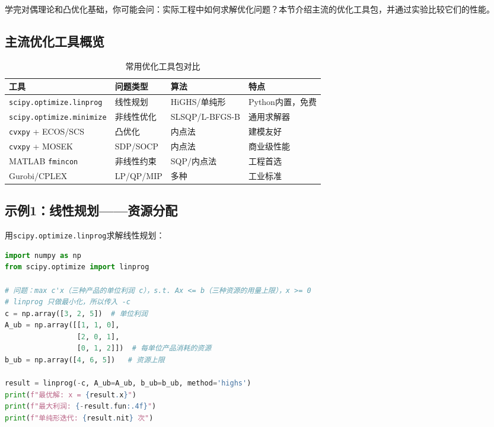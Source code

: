 学完对偶理论和凸优化基础，你可能会问：实际工程中如何求解优化问题？本节介绍主流的优化工具包，并通过实验比较它们的性能。

\subsection*{主流优化工具概览}

\begin{table}[htbp]
\centering
\small
\renewcommand{\arraystretch}{1.3}
\begin{tabularx}{\textwidth}{l|X|X|X}
\toprule
\textbf{工具} & \textbf{问题类型} & \textbf{算法} & \textbf{特点} \\
\midrule
\texttt{scipy.optimize.linprog} & 线性规划 & HiGHS/单纯形 & Python内置，免费 \\
\texttt{scipy.optimize.minimize} & 非线性优化 & SLSQP/L-BFGS-B & 通用求解器 \\
\texttt{cvxpy} + ECOS/SCS & 凸优化 & 内点法 & 建模友好 \\
\texttt{cvxpy} + MOSEK & SDP/SOCP & 内点法 & 商业级性能 \\
MATLAB \texttt{fmincon} & 非线性约束 & SQP/内点法 & 工程首选 \\
Gurobi/CPLEX & LP/QP/MIP & 多种 & 工业标准 \\
\bottomrule
\end{tabularx}
\caption{常用优化工具包对比}
\end{table}

\subsection*{示例1：线性规划——资源分配}

用\texttt{scipy.optimize.linprog}求解线性规划：

\begin{lstlisting}[language=Python, caption=线性规划求解示例]
import numpy as np
from scipy.optimize import linprog

# 问题：max c'x（三种产品的单位利润 c），s.t. Ax <= b（三种资源的用量上限），x >= 0
# linprog 只做最小化，所以传入 -c
c = np.array([3, 2, 5])  # 单位利润
A_ub = np.array([[1, 1, 0],
                 [2, 0, 1],
                 [0, 1, 2]])  # 每单位产品消耗的资源
b_ub = np.array([4, 6, 5])   # 资源上限

result = linprog(-c, A_ub=A_ub, b_ub=b_ub, method='highs')
print(f"最优解: x = {result.x}")
print(f"最大利润: {-result.fun:.4f}")
print(f"单纯形迭代: {result.nit} 次")
\end{lstlisting}

